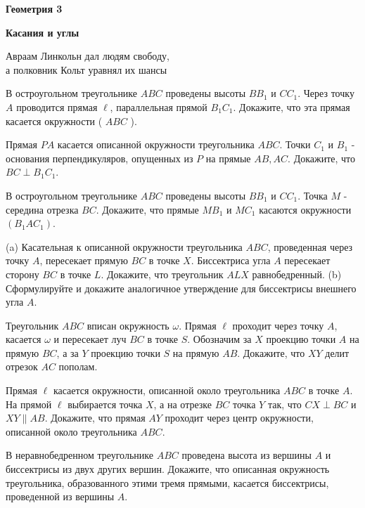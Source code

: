 \centerline{\bf \Huge Геометрия 3}
\centerline{\bf \Huge Касания и углы}

\begin{flushright}
        \scriptsize{Авраам Линкольн дал людям свободу,\\ а полковник Кольт уравнял их шансы}
\end{flushright}

 В остроугольном треугольнике $A B C$ проведены высоты $B B_1$ и $C C_1$. Через точку $A$ проводится прямая $\ell$, параллельная прямой $B_1 C_1$. Докажите, что эта прямая касается окружности ( $A B C$ ).

 Прямая $P A$ касается описанной окружности треугольника $A B C$. Точки $C_1$ и $B_1$ - основания перпендикуляров, опущенных из $P$ на прямые $A B, A C$. Докажите, что $B C \perp B_1 C_1$.

 В остроугольном треугольнике $A B C$ проведены высоты $B B_1$ и $C C_1$. Точка $M$ - середина отрезка $B C$. Докажите, что прямые $M B_1$ и $M C_1$ касаются окружности $\left(B_1 A C_1\right)$.

 (a) Касательная к описанной окружности треугольника $A B C$, проведенная через точку $A$, пересекает прямую $B C$ в точке $X$. Биссектриса угла $A$ пересекает сторону $B C$ в точке $L$. Докажите, что треугольник $A L X$ равнобедренный. (b) Сформулируйте и докажите аналогичное утверждение для биссектрисы внешнего угла $A$.

 Треугольник $A B C$ вписан окружность $\omega$. Прямая $\ell$ проходит через точку $A$, касается $\omega$ и пересекает луч $B C$ в точке $S$. Обозначим за $X$ проекцию точки $A$ на прямую $B C$, а за $Y$ проекцию точки $S$ на прямую $A B$. Докажите, что $X Y$ делит отрезок $A C$ пополам.

 Прямая $\ell$ касается окружности, описанной около треугольника $A B C$ в точке $A$. На прямой $\ell$ выбирается точка $X$, а на отрезке $B C$ точка $Y$ так, что $C X \perp B C$ и $X Y \| A B$. Докажите, что прямая $A Y$ проходит через центр окружности, описанной около треугольника $A B C$.

 В неравнобедренном треугольнике $A B C$ проведена высота из вершины $A$ и биссектрисы из двух других вершин. Докажите, что описанная окружность треугольника, образованного этими тремя прямыми, касается биссектрисы, проведенной из вершины $A$.

\newpage

\hspace{3mm}

